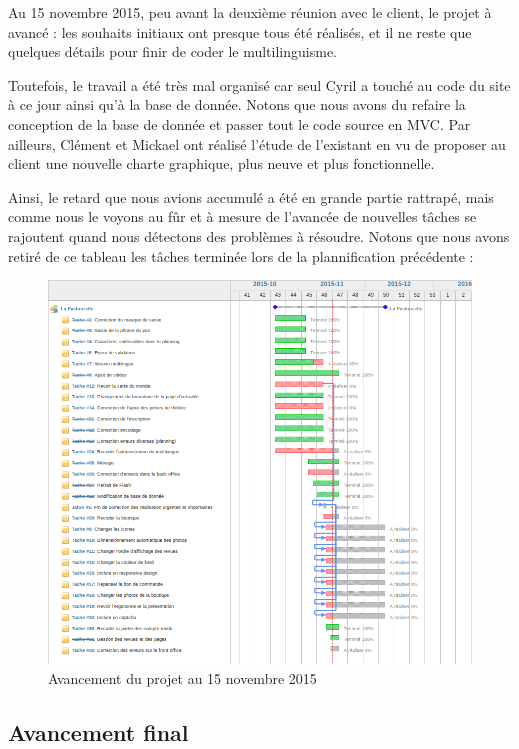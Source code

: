 \documentclass[11pt]{report}
\begin{document}
Au 15 novembre 2015, peu avant la deuxième réunion avec le client, le projet à
avancé : les souhaits initiaux ont presque tous été réalisés, et il ne reste que
quelques détails pour finir de coder le multilinguisme.
\par Toutefois, le travail a été très mal organisé car seul Cyril a touché au
code du site à ce jour ainsi qu'à la base de donnée. Notons que nous avons du
refaire la conception de la base de donnée et passer tout le code source en MVC. Par
ailleurs, Clément et Mickael ont réalisé l'étude de l'existant en vu de proposer
au client une nouvelle charte graphique, plus neuve et plus fonctionnelle.
\par Ainsi, le retard que nous avions accumulé a été en grande partie rattrapé,
mais comme nous le voyons au fûr et à mesure de l'avancée de nouvelles tâches se
rajoutent quand nous détectons des problèmes à résoudre. Notons que nous avons
retiré de ce tableau les tâches terminée lors de la plannification précédente :

\begin{landscape}
\begin{figure}[t]
    \caption{Avancement du projet au 15 novembre 2015}
   \includegraphics[scale=0.5]{include/gantt15-11.png}
\end{figure}
\end{landscape}

\subsection{Avancement final}
\end{document}
